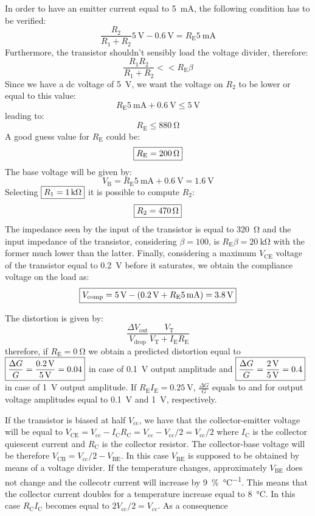 In order to have an emitter current equal to \SI{5}{\milli\ampere}, the following condition has to be verified:
\[\frac{R_2}{R_1+R_2}\SI{5}{\volt}-\SI{0.6}{\volt}=R_\text{E}\SI{5}{\milli\ampere}\]
Furthermore, the transistor shouldn't sensibly load the voltage divider, therefore:
\[\frac{R_1R_2}{R_1+R_2}<<R_\text{E}\beta\]
Since we have a dc voltage of \SI{5}{\volt}, we want the voltage on $R_2$ to be lower or equal to this value:
\[R_\text{E}\SI{5}{\milli\ampere}+\SI{0.6}{\volt}\leq\SI{5}{\volt}\]
leading to:
\[R_\text{E}\leq\SI{880}{\ohm}\]
A good guess value for $R_\text{E}$ could be:
\[\boxed{R_\text{E}=\SI{200}{\ohm}}\]
The base voltage will be given by:
\[V_\text{B}=R_\text{E}\SI{5}{\milli\ampere}+\SI{0.6}{\volt}=\SI{1.6}{\volt}\]
Selecting $\boxed{R_1=\SI{1}{\kilo\ohm}}$ it is possible to compute  $R_2$:
\[\boxed{R_2=\SI{470}{\ohm}}\]
The impedance seen by the input of the transistor is equal to \SI{320}{\ohm} and the input impedance of the transistor, considering $\beta=100$, is $R_\text{E}\beta=  \SI{20}{\kilo\ohm}$ with the former much lower than the latter.
Finally, considering a maximum $V_\text{CE}$ voltage of the transistor equal to \SI{0.2}{\volt} before it saturates, we obtain the compliance voltage on the load as:
\[\boxed{V_\text{comp}=\SI{5}{\volt}-(\SI{0.2}{\volt}+R_\text{E}\SI{5}{\milli\ampere})=\SI{3.8}{\volt}}\]

The distortion is given by:
\[\frac{\Delta V_\text{out}}{V_\text{drop}}\frac{V_\text{T}}{V_\text{T}+I_\text{E}R_\text{E}}\]
therefore, if $R_\text{E}=\SI{0}{\ohm}$ we obtain a predicted distortion equal to $\boxed{\frac{\Delta G}{G}=\frac{\SI{0.2}{\volt}}{\SI{5}{\volt}}=0.04}$ in case of \SI{0.1}{\volt} output amplitude and $\boxed{\frac{\Delta G}{G}=\frac{\SI{2}{\volt}}{\SI{5}{\volt}}=0.4}$ in case of \SI{1}{\volt} output amplitude. If $R_\text{E}I_\text{E}=\SI{0.25}{\volt}$, $\frac{\Delta G}{G}$ equals to  and  for output voltage amplitudes equal to \SI{0.1}{\volt} and \SI{1}{\volt}, respectively.


If the transistor is biased at half $V_\text{cc}$, we have that the collector-emitter voltage will be equal to $V_\text{CE}=V_\text{cc}-I_\text{C}R_\text{C}=V_\text{cc}-V_\text{cc}/2=V_\text{cc}/2$ where $I_\text{C}$ is the collector quiescent current and $R_\text{C}$ is the collector resistor. The collector-base voltage will be therefore $V_\text{CB}=V_\text{cc}/2-V_\text{BE}$. In this case $V_\text{BE}$ is supposed to be obtained by means of a voltage divider. If the temperature changes, approximately $V_\text{BE}$ does not change and the collecotr current will increase by \SI{9}{\percent\per\celsius}. This means that the collector current doubles for a temperature increase equal to \SI{8}{\celsius}. In this case $R_\text{C}I_\text{C}$ becomes equal to $2V_\text{cc}/2=V_\text{cc}$. As a consequence 

